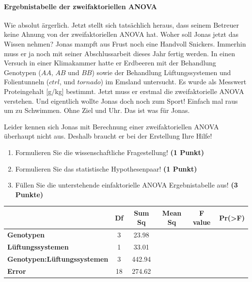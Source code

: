 \documentclass[a4paper, 9pt]{scrartcl}\usepackage[]{graphicx}\usepackage[]{xcolor}
\begin{document}
\paragraph{Ergebnistabelle der zweifaktoriellen ANOVA}

Wie absolut ärgerlich. Jetzt stellt sich tatsächlich heraus, dass seinem Betreuer keine Ahnung von der zweifaktoriellen ANOVA hat. Woher soll Jonas jetzt das Wissen nehmen? Jonas mampft aus Frust noch eine Handvoll Snickers. Immerhin muss er ja noch mit seiner Abschlussarbeit dieses Jahr fertig werden. In einen Versuch in einer Klimakammer hatte er Erdbeeren mit der Behandlung Genotypen ($AA$, $AB$ und $BB$) sowie der Behandlung Lüftungssystemen und Folientunneln ($ctrl$, und $tornado$) im Emsland untersucht. Es wurde als Messwert Proteingehalt [g/kg] bestimmt. Jetzt muss er erstmal die zweifaktorielle ANOVA verstehen. Und eigentlich wollte Jonas doch noch zum Sport! Einfach mal raus um zu Schwimmen. Ohne Ziel und Uhr. Das ist was für Jonas.



\vspace{1ex}

Leider kennen sich Jonas mit Berechnung einer zweifaktoriellen ANOVA überhaupt nicht aus. Deshalb braucht er bei der Erstellung Ihre Hilfe! 

\begin{enumerate}
  \item Formulieren Sie die wissenschaftliche Fragestellung! \textbf{(1 Punkt)}
  \item Formulieren Sie das statistische Hypothesenpaar! \textbf{(1 Punkt)}
\item Füllen Sie die unterstehende einfaktorielle ANOVA Ergebnistabelle aus! \textbf{(3 Punkte)}
\end{enumerate}

\vspace{1Ex}

\begin{center}
  \Large
  \begin{tabular}{lccccc}
  \toprule
     & \textbf{Df} & \textbf{Sum Sq} & \textbf{Mean Sq} & \textbf{F value} & \textbf{Pr(>F)} \strut\\
    \midrule
   \textbf{Genotypen}  & 3 & 23.98 &  &  &  \strut\\
    \textbf{Lüftungssystemen}  & 1 & 33.01 &  &  &  \strut\\
    \textbf{Genotypen:Lüftungssystemen}  & 3 & 442.94 &  &  &  \strut\\
   \textbf{Error}  & 18 & 274.62 &  &  &  \strut\\
\bottomrule
  \end{tabular}
\end{center}
\end{document}
